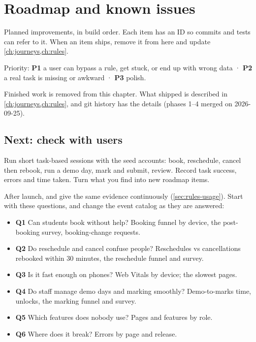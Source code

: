 \chapter{Roadmap and known issues}\label{ch:roadmap}

Planned improvements, in build order. Each item has an ID so commits and tests can refer to it. When an item ships, remove it from here and update \cref{ch:journeys,ch:rules}.

Priority: \textbf{P1} a user can bypass a rule, get stuck, or end up with wrong data · \textbf{P2} a real task is missing or awkward · \textbf{P3} polish.

Finished work is removed from this chapter. What shipped is described in \cref{ch:journeys,ch:rules}, and git history has the details (phases 1--4 merged on 2026-09-25).

\section{Next: check with users}

Run short task-based sessions with the seed accounts: book, reschedule, cancel then rebook, run a demo day, mark and submit, review. Record task success, errors and time taken. Turn what you find into new roadmap items.

After launch,  and  give the same evidence continuously (\cref{sec:rules-usage}). Start with these questions, and change the event catalog as they are answered:

\begin{itemize}
  \item \textbf{Q1} Can students book without help? Booking funnel by device, the post-booking survey, booking-change requests.
  \item \textbf{Q2} Do reschedule and cancel confuse people? Reschedules vs cancellations rebooked within 30 minutes, the reschedule funnel and survey.
  \item \textbf{Q3} Is it fast enough on phones? Web Vitals by device; the slowest pages.
  \item \textbf{Q4} Do staff manage demo days and marking smoothly? Demo-to-marks time, unlocks, the marking funnel and survey.
  \item \textbf{Q5} Which features does nobody use? Pages and features by role.
  \item \textbf{Q6} Where does it break? Errors by page and release.
\end{itemize}

